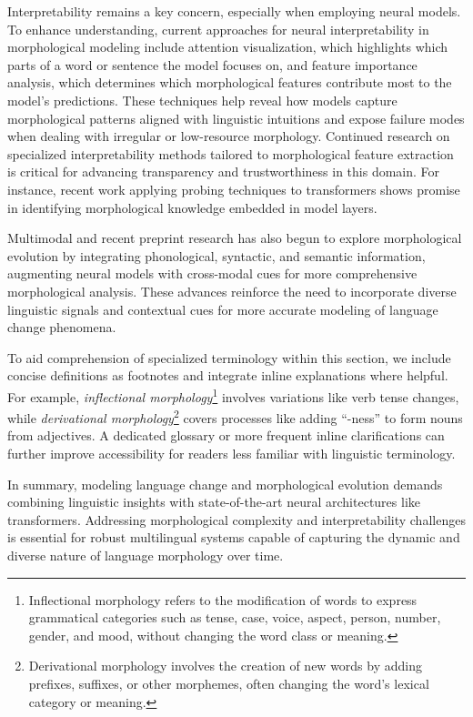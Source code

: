 \documentclass[sigconf]{acmart}
\begin{document}
Interpretability remains a key concern, especially when employing neural models. To enhance understanding, current approaches for neural interpretability in morphological modeling include attention visualization, which highlights which parts of a word or sentence the model focuses on, and feature importance analysis, which determines which morphological features contribute most to the model's predictions. These techniques help reveal how models capture morphological patterns aligned with linguistic intuitions and expose failure modes when dealing with irregular or low-resource morphology. Continued research on specialized interpretability methods tailored to morphological feature extraction is critical for advancing transparency and trustworthiness in this domain. For instance, recent work applying probing techniques to transformers shows promise in identifying morphological knowledge embedded in model layers.

Multimodal and recent preprint research has also begun to explore morphological evolution by integrating phonological, syntactic, and semantic information, augmenting neural models with cross-modal cues for more comprehensive morphological analysis. These advances reinforce the need to incorporate diverse linguistic signals and contextual cues for more accurate modeling of language change phenomena.

To aid comprehension of specialized terminology within this section, we include concise definitions as footnotes and integrate inline explanations where helpful. For example, \textit{inflectional morphology}\footnote{Inflectional morphology refers to the modification of words to express grammatical categories such as tense, case, voice, aspect, person, number, gender, and mood, without changing the word class or meaning.} involves variations like verb tense changes, while \textit{derivational morphology}\footnote{Derivational morphology involves the creation of new words by adding prefixes, suffixes, or other morphemes, often changing the word’s lexical category or meaning.} covers processes like adding “-ness” to form nouns from adjectives. A dedicated glossary or more frequent inline clarifications can further improve accessibility for readers less familiar with linguistic terminology.

In summary, modeling language change and morphological evolution demands combining linguistic insights with state-of-the-art neural architectures like transformers. Addressing morphological complexity and interpretability challenges is essential for robust multilingual systems capable of capturing the dynamic and diverse nature of language morphology over time.
\end{document}
